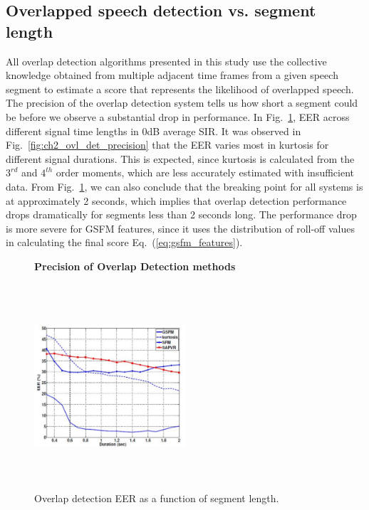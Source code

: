 {\subsection{Overlapped speech detection vs. segment length}
\label{sssec:ovl_frame_vs_seg_gsfm}
All overlap detection algorithms presented in this study use the collective knowledge obtained from multiple adjacent time frames from a given speech segment to estimate a score that represents the likelihood of overlapped speech. 
The precision of the overlap detection system tells us how short a segment could be before we observe a substantial drop in performance. 
In Fig.~\ref{fig:ch2_ovl_det_precision_gsfm}, EER across different signal time lengths in 0dB average SIR. 
It was observed in Fig.~\ref{fig:ch2_ovl_det_precision} that the EER varies most in kurtosis for different signal durations. 
This is expected, since kurtosis is calculated from the $3^{rd}$ and $4^{th}$ order moments, which are less accurately estimated with insufficient data. 
From Fig.~\ref{fig:ch2_ovl_det_precision_gsfm}, we can also conclude that the breaking point for all systems is at approximately 2 seconds, which implies that overlap detection performance drops dramatically for segments less than 2 seconds long. 
The performance drop is more severe for GSFM features, since it uses the distribution of roll-off values in calculating the final score Eq.~(\ref{eq:gsfm_features}). 

\begin{figure}[h!]
	\centering
	\hspace{-1mm}
	\textbf{Precision of Overlap Detection methods}\par\medskip
	\includegraphics[height = 3in, width=0.5\textwidth]{figures/eer_vs_time_gsfm}
	\vspace{-1mm}
	\caption{ Overlap detection EER as a function of segment length. }
	\vspace{0mm}
	\label{fig:ch2_ovl_det_precision_gsfm}
\end{figure}

}
